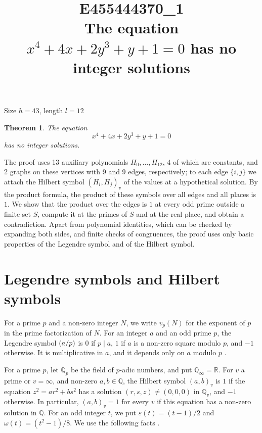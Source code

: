 \documentclass[11pt]{article}
\title{\textbf{E455444370\_1}\\[4pt] {\Large The equation $x^{4}+4x+2y^{3}+y+1=0$ has no integer solutions}}
\author{}
\date{}
\newtheorem{theorem}{Theorem}
\newcommand{\Q}{\mathbb{Q}}
\newcommand{\leg}[2]{\mathchoice{\biggl(\dfrac{#1}{#2}\biggr)}{(#1/#2)}{(#1/#2)}{(#1/#2)}}
\begin{document}
\maketitle
\vspace{-8ex}
\begin{center}
Size $h=43$, length $l=12$
\end{center}

\begin{theorem}\label{thm:main}
The equation
\begin{equation}\label{eq:main}
x^{4}+4x+2y^{3}+y+1=0
\end{equation}
has no integer solutions.
\end{theorem}

The proof uses 13 auxiliary polynomials $H_0,\dots,H_{12}$, 4 of which are constants, and 2 graphs on these vertices with 9 and 9 edges, respectively; to each edge $\{i,j\}$ we attach the Hilbert symbol $(H_i,H_j)_v$ of the values at a hypothetical solution. By the product formula, the product of these symbols over all edges and all places is $1$. We show that the product over the edges is $1$ at every odd prime outside a finite set $S$, compute it at the primes of $S$ and at the real place, and obtain a contradiction. Apart from polynomial identities, which can be checked by expanding both sides, and finite checks of congruences, the proof uses only basic properties of the Legendre symbol and of the Hilbert symbol.

\section{Legendre symbols and Hilbert symbols}

For a prime $p$ and a non-zero integer $N$, we write $v_p(N)$ for the exponent of $p$ in the prime factorization of $N$. For an integer $a$ and an odd prime $p$, the Legendre symbol $\leg{a}{p}$ is $0$ if $p\mid a$, $1$ if $a$ is a non-zero square modulo $p$, and $-1$ otherwise. It is multiplicative in $a$, and it depends only on $a$ modulo $p$ \cite[Chapter~5]{IR}.

For a prime $p$, let $\Q_p$ be the field of $p$-adic numbers, and put $\Q_\infty=\mathbb R$. For $v$ a prime or $v=\infty$, and non-zero $a,b\in\Q$, the Hilbert symbol $(a,b)_v$ is $1$ if the equation $z^2=ar^2+bs^2$ has a solution $(r,s,z)\neq(0,0,0)$ in $\Q_v$, and $-1$ otherwise. In particular, $(a,b)_v=1$ for every $v$ if this equation has a non-zero solution in $\Q$. For an odd integer $t$, we put $\varepsilon(t)=(t-1)/2$ and $\omega(t)=(t^2-1)/8$. We use the following facts \cite[Chapter~III, Proposition~2 and Theorems~1 and~3]{Se}.
\end{document}
